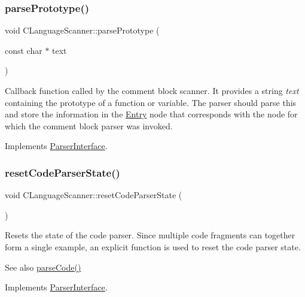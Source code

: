 \subsubsection{\texorpdfstring{parsePrototype()}{parsePrototype()}}
{\footnotesize\ttfamily void C\+Language\+Scanner\+::parse\+Prototype (\begin{DoxyParamCaption}\item[{const char $\ast$}]{text }\end{DoxyParamCaption})\hspace{0.3cm}{\ttfamily [virtual]}}

Callback function called by the comment block scanner. It provides a string {\itshape text} containing the prototype of a function or variable. The parser should parse this and store the information in the \mbox{\hyperlink{class_entry}{Entry}} node that corresponds with the node for which the comment block parser was invoked. 

Implements \mbox{\hyperlink{class_parser_interface_a5ebf0f524a296845befa22c85a4cc80b}{Parser\+Interface}}.

\mbox{\label{class_c_language_scanner_a2d569ccde3f87597741b3cde8efb3af5}} 
\subsubsection{\texorpdfstring{resetCodeParserState()}{resetCodeParserState()}}
{\footnotesize\ttfamily void C\+Language\+Scanner\+::reset\+Code\+Parser\+State (\begin{DoxyParamCaption}{ }\end{DoxyParamCaption})\hspace{0.3cm}{\ttfamily [virtual]}}

Resets the state of the code parser. Since multiple code fragments can together form a single example, an explicit function is used to reset the code parser state. \begin{DoxySeeAlso}{See also}
\mbox{\hyperlink{class_c_language_scanner_a1d8d53789892f16d48fc90878d825f76}{parse\+Code()}} 
\end{DoxySeeAlso}


Implements \mbox{\hyperlink{class_parser_interface_aee4fccd1865a4e8a6b9f2896811104ca}{Parser\+Interface}}.

